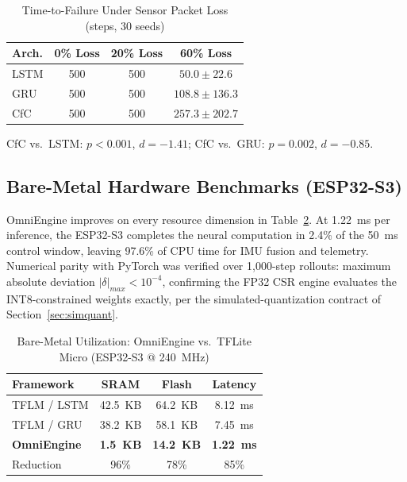 \documentclass[10pt,journal]{IEEEtran}
\begin{document}
\begin{table}[t]
\caption{Time-to-Failure Under Sensor Packet Loss (steps, 30 seeds)}
\label{tab:jitter}
\centering\footnotesize
\begin{tabular}{@{}lccc@{}}
\toprule
Arch. & 0\% Loss & 20\% Loss & 60\% Loss \\
\midrule
LSTM & 500 & 500 & $50.0\pm22.6$ \\
GRU & 500 & 500 & $108.8\pm136.3$ \\
CfC & 500 & 500 & $257.3\pm202.7$ \\
\bottomrule
\end{tabular}
\vspace{2pt}
{\raggedright\scriptsize CfC vs.\ LSTM: $p<0.001$, $d=-1.41$; CfC vs.\ GRU: $p=0.002$, $d=-0.85$.\par}
\vspace{-6pt}
\end{table}

\subsection{Bare-Metal Hardware Benchmarks (ESP32-S3)}
\label{sec:hw}

OmniEngine improves on every resource dimension in Table~\ref{tab:util}. At 1.22~ms per inference, the ESP32-S3 completes the neural computation in 2.4\% of the 50~ms control window, leaving 97.6\% of CPU time for IMU fusion and telemetry. Numerical parity with PyTorch was verified over 1,000-step rollouts: maximum absolute deviation $|\delta|_{max}<10^{-4}$, confirming the FP32 CSR engine evaluates the INT8-constrained weights exactly, per the simulated-quantization contract of Section~\ref{sec:simquant}.

\begin{table}[t]
\caption{Bare-Metal Utilization: OmniEngine vs.\ TFLite Micro (ESP32-S3 @ 240~MHz)}
\label{tab:util}
\centering\footnotesize
\begin{tabular}{@{}lccc@{}}
\toprule
Framework & SRAM & Flash & Latency \\
\midrule
TFLM / LSTM & 42.5~KB & 64.2~KB & 8.12~ms \\
TFLM / GRU & 38.2~KB & 58.1~KB & 7.45~ms \\
\textbf{OmniEngine} & \textbf{1.5~KB} & \textbf{14.2~KB} & \textbf{1.22~ms} \\
\midrule
Reduction & 96\% & 78\% & 85\% \\
\bottomrule
\end{tabular}
\vspace{-6pt}
\end{table}
\end{document}
